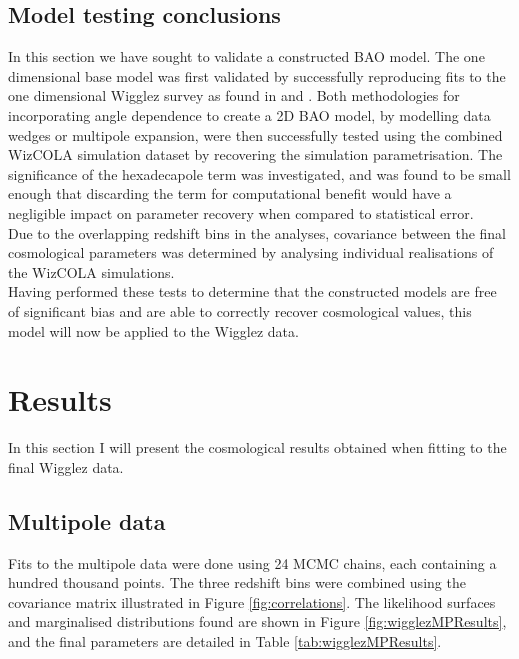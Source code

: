 \documentclass[titlesmallcaps, examinerscopy, copyrightpage]{uqthesis}
\begin{document}
\section{Model testing conclusions}

In this section we have sought to validate a constructed BAO model. The one dimensional base model was first validated by successfully reproducing fits to the one dimensional Wigglez survey as found in \citet{BlakeDavis2011} and \citet{BlakeKazin2011}. Both methodologies for incorporating angle dependence to create a 2D BAO model, by modelling data wedges or multipole expansion, were then successfully tested using the combined WizCOLA simulation dataset by recovering the simulation parametrisation. The significance of the hexadecapole term was investigated, and was found to be small enough that discarding the term for computational benefit would have a negligible impact on parameter recovery when compared to statistical error.\\

Due to the overlapping redshift bins in the analyses, covariance between the final cosmological parameters was determined by analysing individual realisations of the WizCOLA simulations. \\

Having performed these tests to determine that the constructed models are free of significant bias and are able to correctly recover cosmological values, this model will now be applied to the Wigglez data.













\chapter{Results}

In this section I will present the cosmological results obtained when fitting to the final Wigglez data.

\section{Multipole data}

Fits to the multipole data were done using 24 MCMC chains, each containing a hundred thousand points. The three redshift bins were combined using the covariance matrix illustrated in Figure \ref{fig:correlations}. The likelihood surfaces and marginalised distributions found are shown in Figure \ref{fig:wigglezMPResults}, and the final parameters are detailed in Table \ref{tab:wigglezMPResults}.
\end{document}
